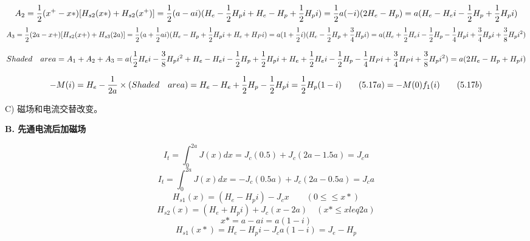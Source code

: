 \begin{equation}%
A_{2}=\frac{1}{2}(x^{+}-x*)[H_{s2}(x*)+H_{s2}(x^{+})]\\
=\frac{1}{2}(a-ai)(H_{e}-\frac{1}{2}H_{p}i+H_{e}-H_{p}+\frac{1}{2}H_{p}i)\\
=\frac{1}{2}a(-i)(2H_{e}-H_{p})\\
=a(H_{e}-H_{e}i-\frac{1}{2}H_{p}+\frac{1}{2}H_{p}i)
\end{equation}
\begin{equation}%
A_{3}=\frac{1}{2}(2a-x+)[H_{s2}(x+)+H_{s3}(2a)]\\
=\frac{1}{2}(a+\frac{1}{2}ai)(H_{e}-H_{p}+\frac{1}{2}H_{p}i+H_{e}+H_{P}i)\\
=a(1+\frac{1}{2}i)(H_{e}-\frac{1}{2}H_{p}+\frac{3}{4}H_{p}i)\\
=a(H_{e}+\frac{1}{2}H_{e}i-\frac{1}{2}H_{p}-\frac{1}{4}H_{p}i+\frac{3}{4}H_{p}i+\frac{3}{8}H_{p}i^{2})
\end{equation}



\begin{equation}%
Shaded\quad area=A_{1}+A_{2}+A_{3}\\
=a(\frac{1}{2}H_{e}i-\frac{3}{8}H_{p}i^{2}+H_{e}-H_{e}i-\frac{1}{2}H_{p}+\frac{1}{2}H_{p}i\\
+H_{e}+\frac{1}{2}H_{e}i-\frac{1}{2}H_{p}-\frac{1}{4}H_{P}i+\frac{3}{4}H_{P}i+\frac{3}{8}H_{p}i^{2})\\
=a(2H_{e}-H_{p}+H_{p}i)
\end{equation}



\begin{equation}%
-M(i)=H_{e}-\frac{1}{2a}\times(Shaded\quad area)\\
=H_{e}-H_{e}+\frac{1}{2}H_{p}-\frac{1}{2}H_{p}i\\
=\frac{1}{2}H_{p}(1-i)\qquad(5.17a)\\
=-M(0)f_{1}(i)\qquad(5.17b)
\end{equation}

C) 磁场和电流交替改变。

\textbf{B. 先通电流后加磁场}

\begin{equation}%
I_{t}=\int_{0}^{2a}J(x)dx=J_{c}(0.5)+J_{c}(2a-1.5a)=J_{c}a
\end{equation}
\begin{equation}%
I_{t}=\int_{0}^{2a}J(x)dx=-J_{c}(0.5a)+J_{c}(2a-0.5a)=J_{c}a
\end{equation}
\begin{equation}%
H_{s1}(x)=(H_{e}-H_{p}i)-J_{c}x\qquad(0\leq \leq x*)
\end{equation}
\begin{equation}%
H_{s2}(x)=(H_{e}+H_{p}i)+J_{c}(x-2a)\quad(x*\leq x leq  2a)
\end{equation}
\begin{equation}%
x*=a-ai=a(1-i)
\end{equation}
\begin{equation}%
H_{s1}(x*)=H_{e}-H_{p}i-J_{c}a(1-i)=J_{e}-H_{p}
\end{equation}

